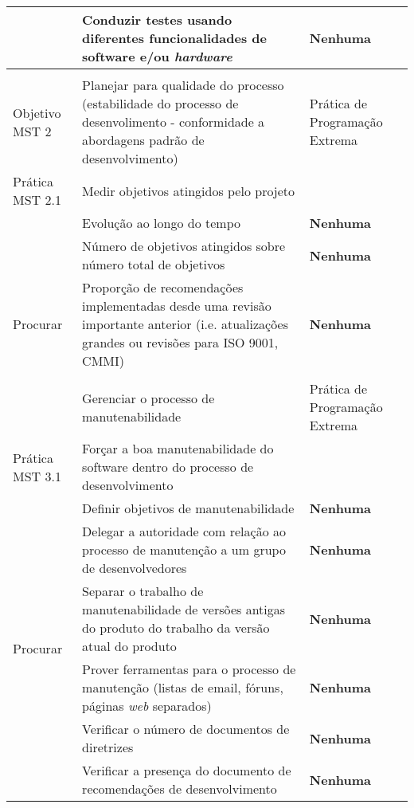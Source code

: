 \begin{longtable}{|p{2cm}|p{7cm}|p{7cm}|}
    \cline{2-3} & Conduzir testes usando diferentes funcionalidades de
    software e/ou \textit{hardware} &\textbf{Nenhuma} \\
    \hline
    & & \\
    \hline \cellcolor[gray]{0.6} Objetivo MST 2 &
    \cellcolor[gray]{0.6} Planejar para qualidade do processo
    (estabilidade do processo de desenvolimento - conformidade a
    abordagens padrão de
    desenvolvimento) & Prática de Programação Extrema \\
    \hline \cellcolor[gray]{0.9} Prática MST 2.1 &
    \cellcolor[gray]{0.9} Medir objetivos atingidos pelo projeto & \\
    \hline \multirow{5}{*}{Procurar} & Evolução ao longo do tempo &
    \textbf{Nenhuma} \\
    \cline{2-3} & Número de objetivos atingidos sobre número total de
    objetivos & \textbf{Nenhuma} \\
    \cline{2-3} & Proporção de recomendações implementadas desde uma
    revisão importante anterior (i.e. atualizações grandes ou revisões
    para ISO 9001, CMMI) & \textbf{Nenhuma} \\
    \hline
    & & \\
    \hline \cellcolor[gray]{0.6} Objetivo MST 3 &
    \cellcolor[gray]{0.6} Gerenciar o processo de manutenabilidade &
    Prática de Programação
    Extrema \\
    \hline \cellcolor[gray]{0.9} Prática MST 3.1 &
    \cellcolor[gray]{0.9} Forçar a boa manutenabilidade do software
    dentro do processo de
    desenvolvimento & \\
    \hline \multirow{8}{*}{Procurar} & Definir objetivos de
    manutenabilidade & \textbf{Nenhuma} \\
    \cline{2-3} & Delegar a autoridade com relação ao processo de
    manutenção a um grupo de desenvolvedores  &\textbf{Nenhuma} \\
    \cline{2-3} & Separar o trabalho de manutenabilidade de versões
    antigas do produto do trabalho da versão atual do produto
    &\textbf{Nenhuma} \\
    \cline{2-3} & Prover ferramentas para o processo de manutenção
    (listas de email, fóruns, páginas \textit{web} separados)
    &\textbf{Nenhuma} \\
    \cline{2-3} & Verificar o número de documentos de diretrizes
    &\textbf{Nenhuma} \\
    \cline{2-3} & Verificar a presença do documento de recomendações
    de desenvolvimento &\textbf{Nenhuma} \\

\end{longtable}
